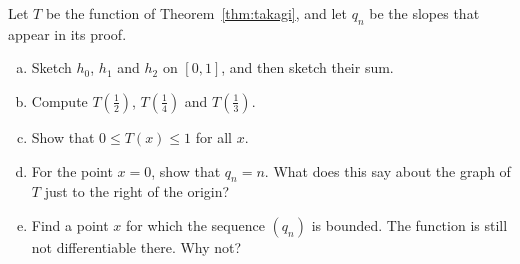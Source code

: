 \begin{problem}
Let $T$ be the function of Theorem~\ref{thm:takagi}, and let $q_n$ be the slopes that appear in its proof.
\begin{enumerate}[(a)]
	\item Sketch $h_0$, $h_1$ and $h_2$ on $[0,1]$, and then sketch their sum.
	\item Compute $T\left(\frac12\right)$, $T\left(\frac14\right)$ and $T\left(\frac13\right)$.
	\item Show that $0 \leq T(x) \leq 1$ for all $x$.
	\item For the point $x = 0$, show that $q_n = n$.  What does this say about the graph of $T$ just to the right of the origin?
	\item Find a point $x$ for which the sequence $(q_n)$ is bounded.  The function is still not differentiable there.  Why not?
\end{enumerate}
\end{problem}
